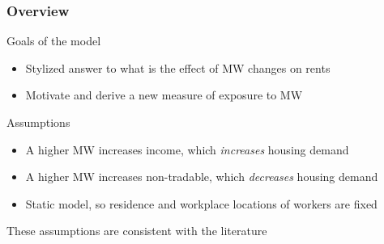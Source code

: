 \documentclass[aspectratio=169, t]{beamer}
\begin{document}
\begin{frame}
    \frametitle{Overview}
    
    Goals of the model
    \begin{itemize}
        \item Stylized answer to what is the effect of MW changes on rents
        \item Motivate and derive a new measure of exposure to MW
    \end{itemize}
    
    \pause
    \vspace{3mm}
    Assumptions
    \begin{itemize}
        \item A higher MW increases income, which \textit{increases} housing demand
        \item A higher MW increases non-tradable, which \textit{decreases} housing demand
        \item Static model, so residence and workplace locations of workers are fixed
    \end{itemize}

    \vspace{1mm}
    These assumptions are consistent with the literature

\end{frame}
\end{document}
